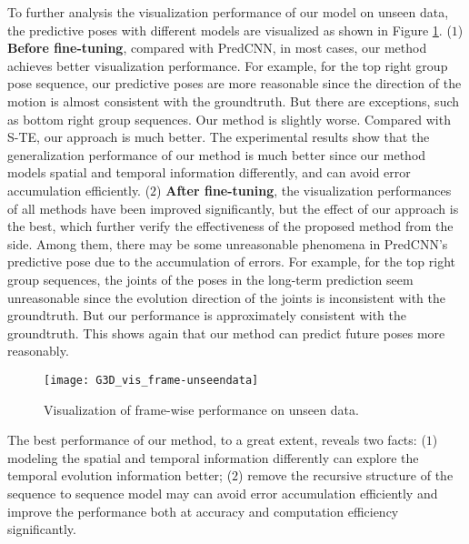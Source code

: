 \documentclass[journal]{IEEEtran}
\begin{document}
To further analysis the visualization performance of our model on unseen data, the predictive poses with different models are visualized as shown in Figure \ref{fig15}. (${1}$) {\bf Before fine-tuning}, compared with PredCNN, in most cases, our method achieves better visualization performance. For example, for the top right group pose sequence, our predictive poses are more reasonable since the direction of the motion is almost consistent with the groundtruth. But there are exceptions, such as bottom right group sequences. Our method is slightly worse. Compared with S-TE, our approach is much better. The experimental results show that the generalization performance of our method is much better since our method models spatial and temporal information differently, and can avoid error accumulation efficiently. (${2}$) {\bf After fine-tuning}, the visualization performances of all methods have been improved significantly, but the effect of our approach is the best, which further verify the effectiveness of the proposed method from the side. Among them, there may be some unreasonable phenomena in PredCNN's predictive pose due to the accumulation of errors. For example, for the top right group sequences, the joints of the poses in the long-term prediction seem unreasonable since the evolution direction of the joints is inconsistent with the groundtruth. But our performance is approximately consistent with the groundtruth. This shows again that our method can predict future poses more reasonably.

\begin{figure}[!t]
\centering
\texttt{[image: G3D\_vis\_frame-unseendata]}
\caption{Visualization of frame-wise performance on unseen data.}
\label{fig15}
\end{figure}

The best performance of our method, to a great extent, reveals two facts: (${1}$) modeling the spatial and temporal information differently can explore the temporal evolution information better; (${2}$) remove the recursive structure of the sequence to sequence model may can avoid error accumulation efficiently and improve the performance both at accuracy and computation efficiency significantly.
\end{document}
